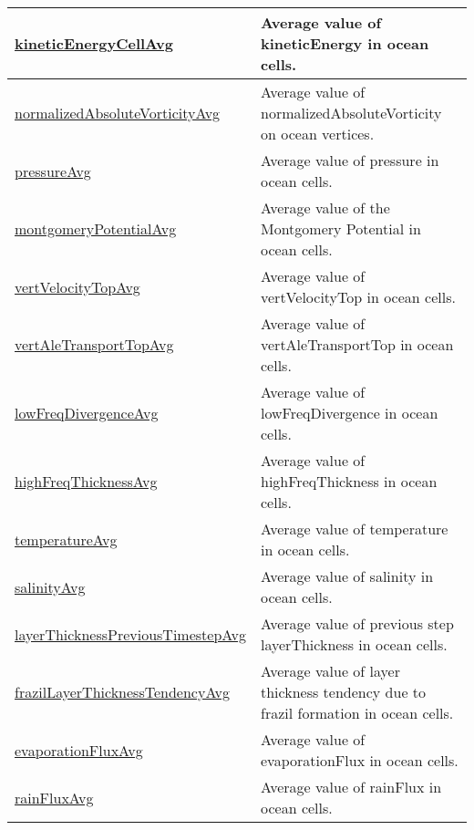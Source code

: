 {\begin{center}
\begin{longtable}{| p{2.0in} | p{4.0in} |}
    \hline
    \hyperref[subsec:var_sec_globalStatsAM_kineticEnergyCellAvg]{kineticEnergyCellAvg} & Average value of kineticEnergy in ocean cells. \\
    \hline
    \hyperref[subsec:var_sec_globalStatsAM_normalizedAbsoluteVorticityAvg]{normalizedAbsoluteVorticityAvg} & Average value of normalizedAbsoluteVorticity on ocean vertices. \\
    \hline
    \hyperref[subsec:var_sec_globalStatsAM_pressureAvg]{pressureAvg} & Average value of pressure in ocean cells. \\
    \hline
    \hyperref[subsec:var_sec_globalStatsAM_montgomeryPotentialAvg]{montgomeryPotentialAvg} & Average value of the Montgomery Potential in ocean cells. \\
    \hline
    \hyperref[subsec:var_sec_globalStatsAM_vertVelocityTopAvg]{vertVelocityTopAvg} & Average value of vertVelocityTop in ocean cells. \\
    \hline
    \hyperref[subsec:var_sec_globalStatsAM_vertAleTransportTopAvg]{vertAleTransportTopAvg} & Average value of vertAleTransportTop in ocean cells. \\
    \hline
    \hyperref[subsec:var_sec_globalStatsAM_lowFreqDivergenceAvg]{lowFreqDivergenceAvg} & Average value of lowFreqDivergence in ocean cells. \\
    \hline
    \hyperref[subsec:var_sec_globalStatsAM_highFreqThicknessAvg]{highFreqThicknessAvg} & Average value of highFreqThickness in ocean cells. \\
    \hline
    \hyperref[subsec:var_sec_globalStatsAM_temperatureAvg]{temperatureAvg} & Average value of temperature in ocean cells. \\
    \hline
    \hyperref[subsec:var_sec_globalStatsAM_salinityAvg]{salinityAvg} & Average value of salinity in ocean cells. \\
    \hline
    \hyperref[subsec:var_sec_globalStatsAM_layerThicknessPreviousTimestepAvg]{layerThicknessPreviousTimestep\-Avg} & Average value of previous step layerThickness in ocean cells. \\
    \hline
    \hyperref[subsec:var_sec_globalStatsAM_frazilLayerThicknessTendencyAvg]{frazilLayerThicknessTendencyAvg} & Average value of layer thickness tendency due to frazil formation in ocean cells. \\
    \hline
    \hyperref[subsec:var_sec_globalStatsAM_evaporationFluxAvg]{evaporationFluxAvg} & Average value of evaporationFlux in ocean cells. \\
    \hline
    \hyperref[subsec:var_sec_globalStatsAM_rainFluxAvg]{rainFluxAvg} & Average value of rainFlux in ocean cells. \\

\end{longtable}
\end{center}}
